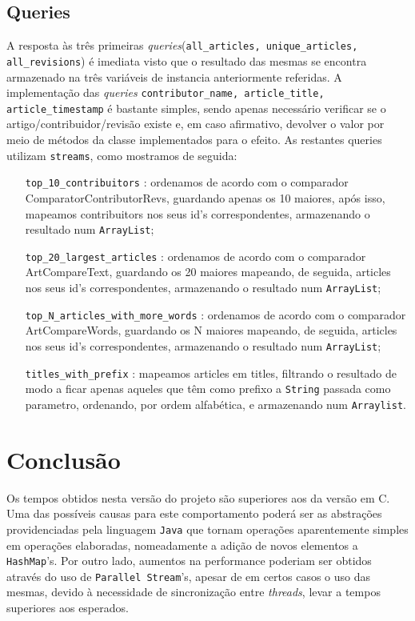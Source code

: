 \documentclass[a4paper,11pt]{article}
\begin{document}
\subsection{Queries}
A resposta às três primeiras \textit{queries}(\texttt{all\_articles, unique\_articles, all\_revisions}) é imediata visto que o resultado das mesmas se encontra armazenado na três variáveis de instancia anteriormente referidas. A implementação das \textit{queries} \texttt{contributor\_name, article\_title, article\_timestamp} é bastante simples, sendo apenas necessário verificar se o artigo/contribuidor/revisão existe e, em caso afirmativo, devolver o valor por meio de métodos da classe implementados para o efeito. As restantes queries utilizam \texttt{streams}, como mostramos de seguida:
\begin{itemize}[align=left]
\item[\texttt{top\_10\_contribuitors}] : ordenamos de acordo com o comparador ComparatorContributorRevs, guardando apenas os 10 maiores, após isso, mapeamos contribuitors nos seus id's correspondentes, armazenando o resultado num \texttt{ArrayList};
\item[\texttt{top\_20\_largest\_articles}] : ordenamos de acordo com o comparador ArtCompareText, guardando os 20 maiores mapeando, de seguida, articles nos seus id's correspondentes, armazenando o resultado num \texttt{ArrayList};
\item[\texttt{top\_N\_articles\_with\_more\_words}] : ordenamos de acordo com o comparador ArtCompareWords, guardando os N maiores mapeando, de seguida, articles nos seus id's correspondentes, armazenando o resultado num \texttt{ArrayList};
\item[\texttt{titles\_with\_prefix}] : mapeamos articles em titles, filtrando o resultado de modo a ficar apenas aqueles que têm como prefixo a \texttt{String} passada como parametro, ordenando, por ordem alfabética, e armazenando num \texttt{Arraylist}.
\end{itemize}

\newpage

\section{Conclusão}
Os tempos obtidos nesta versão do projeto são superiores aos da versão em C. Uma das possíveis causas para este comportamento poderá ser as abstrações providenciadas pela linguagem \texttt{Java} que tornam operações aparentemente simples em operações elaboradas, nomeadamente a adição de novos elementos a \texttt{HashMap}'s. Por outro lado, aumentos na performance poderiam ser obtidos através do uso de \texttt{Parallel Stream}'s, apesar de em certos casos o uso das mesmas, devido à necessidade de sincronização entre \textit{threads}, levar a tempos superiores aos esperados.
\end{document}

